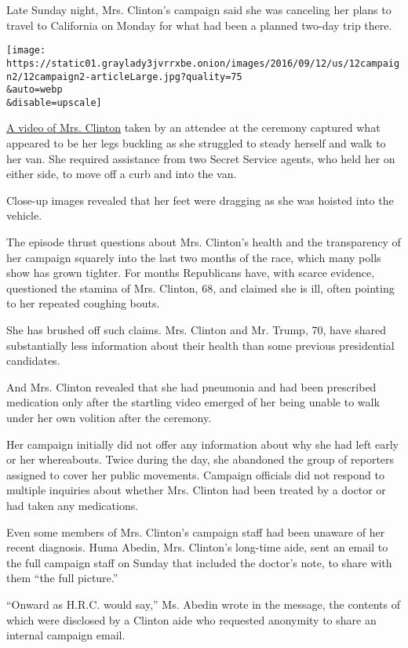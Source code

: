 Late Sunday night, Mrs. Clinton's campaign said she was canceling her
plans to travel to California on Monday for what had been a planned
two-day trip there.

\texttt{[image: https://static01.graylady3jvrrxbe.onion/images/2016/09/12/us/12campaign2/12campaign2-articleLarge.jpg?quality=75\\\&auto=webp\\\&disable=upscale]}

\href{https://twitter.com/zgazda66/status/774993814025011200}{A video of
Mrs. Clinton} taken by an attendee at the ceremony captured what
appeared to be her legs buckling as she struggled to steady herself and
walk to her van. She required assistance from two Secret Service agents,
who held her on either side, to move off a curb and into the van.

Close-up images revealed that her feet were dragging as she was hoisted
into the vehicle.

The episode thrust questions about Mrs. Clinton's health and the
transparency of her campaign squarely into the last two months of the
race, which many polls show has grown tighter. For months Republicans
have, with scarce evidence, questioned the stamina of Mrs. Clinton, 68,
and claimed she is ill, often pointing to her repeated coughing bouts.

She has brushed off such claims. Mrs. Clinton and Mr. Trump, 70, have
shared substantially less information about their health than some
previous presidential candidates.

And Mrs. Clinton revealed that she had pneumonia and had been prescribed
medication only after the startling video emerged of her being unable to
walk under her own volition after the ceremony.

Her campaign initially did not offer any information about why she had
left early or her whereabouts. Twice during the day, she abandoned the
group of reporters assigned to cover her public movements. Campaign
officials did not respond to multiple inquiries about whether Mrs.
Clinton had been treated by a doctor or had taken any medications.

Even some members of Mrs. Clinton's campaign staff had been unaware of
her recent diagnosis. Huma Abedin, Mrs. Clinton's long-time aide, sent
an email to the full campaign staff on Sunday that included the doctor's
note, to share with them ``the full picture.''

``Onward as H.R.C. would say,'' Ms. Abedin wrote in the message, the
contents of which were disclosed by a Clinton aide who requested
anonymity to share an internal campaign email.

